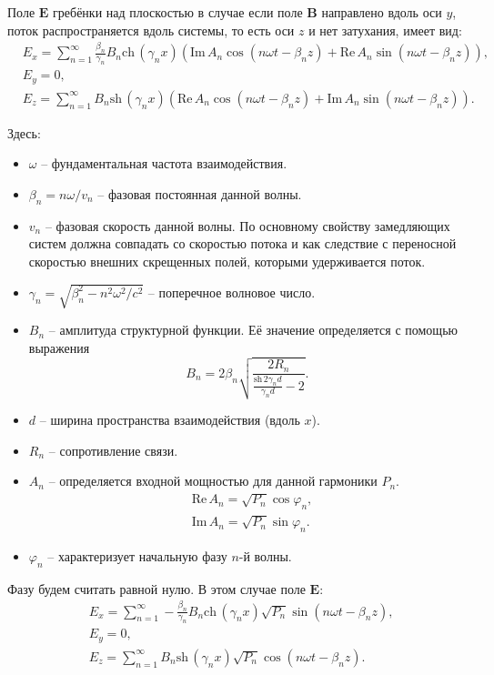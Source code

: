 \documentclass[a4paper,14pt]{extreport} %
\renewcommand{\vec}[1]{\bm{#1}}
\renewcommand{\cosh}{\mathrm{ch}\,}
\renewcommand{\sinh}{\mathrm{sh}\,}
\renewcommand{\Im}{\mathrm{Im}\,}
\renewcommand{\Re}{\mathrm{Re}\,}
\begin{document}
Поле $\vec{E}$ гребёнки над плоскостью в случае если поле $\vec{B}$ направлено вдоль оси $y$, поток распространяется вдоль системы, то есть оси $z$ и нет затухания, имеет вид:
\begin{equation*}
\begin{aligned}
& E_x = \sum\limits_{n=1}^{\infty} \frac{\beta_n}{\gamma_n} B_n \cosh (\gamma_n x) (\Im A_n \cos (n\omega t - \beta_n z) + \Re A_n \sin (n\omega t - \beta_n z)), \\
& E_y = 0, \\
& E_z = \sum\limits_{n=1}^{\infty} B_n \sinh (\gamma_n x) (\Re A_n \cos (n\omega t - \beta_n z) + \Im A_n \sin (n\omega t - \beta_n z)).
\end{aligned}
\end{equation*} 

Здесь:
\begin{itemize}
	\item[] $\omega$ -- фундаментальная частота взаимодействия.
	\item[] $\beta_n = n\omega/v_n$ -- фазовая постоянная данной волны.
	\item[] $v_n$ -- фазовая скорость данной волны. По основному свойству замедляющих систем должна совпадать со скоростью потока и как следствие с переносной скоростью внешних скрещенных полей, которыми удерживается поток.
	\item[] $\gamma_n = \sqrt{\beta^2_n - n^2\omega^2/c^2}$ -- поперечное волновое число.
	\item[] $B_n$ -- амплитуда структурной функции. Её значение определяется с помощью выражения
	\[
	B_n = 2\beta_n \sqrt{\dfrac{2R_n}{\frac{\sinh 2\gamma_n d}{\gamma_n d} -2}}.
	\]
	\item[] $d$ -- ширина пространства взаимодействия (вдоль $x$). 
	\item[] $R_n$ -- сопротивление связи.
	\item[] $A_n$ --  определяется входной мощностью для данной гармоники $P_n$. 
	\begin{align*}
	& \Re A_n = \sqrt{P_n} \cos \varphi_n, \\
	& \Im A_n = \sqrt{P_n} \sin \varphi_n.
	\end{align*}
	\item[] $\varphi_n$ -- характеризует начальную фазу $n$-й волны.
\end{itemize}

Фазу будем считать равной нулю. В этом случае поле $\vec{E}$:
\begin{equation}
\begin{aligned}
& E_x = \sum\limits_{n=1}^{\infty} -\frac{\beta_n}{\gamma_n} B_n \cosh (\gamma_n x) \sqrt{P_n} \sin (n\omega t - \beta_n z), \\
& E_y = 0, \\
& E_z = \sum\limits_{n=1}^{\infty} B_n \sinh (\gamma_n x) \sqrt{P_n} \cos (n\omega t - \beta_n z).
\end{aligned} 
\end{equation}
\end{document}
